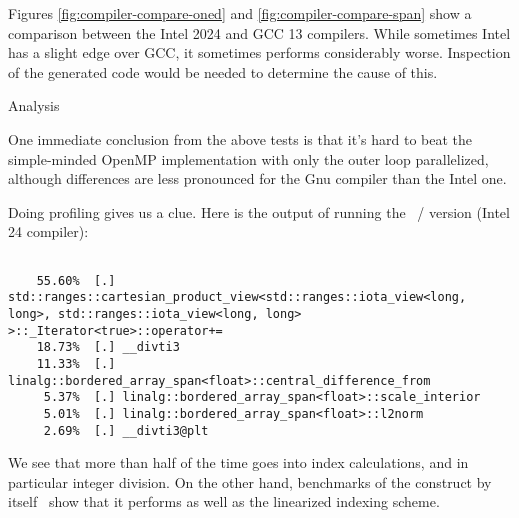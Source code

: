 Figures \ref{fig:compiler-compare-oned} and \ref{fig:compiler-compare-span}
show a comparison between the Intel 2024 and GCC 13 compilers.
While sometimes Intel has a slight edge over GCC, it sometimes
performs considerably worse.
Inspection of the generated code would be needed to determine the cause of this.

 {Analysis}
\label{sec:d2d-profile}

One immediate conclusion from the above tests is that it's
hard to beat the simple-minded OpenMP implementation
with only the outer loop parallelized,
although differences are less pronounced for the Gnu compiler
than the Intel one.

Doing profiling gives us a clue.
Here is the output of running the ~/ 
version (Intel 24 compiler):
\begin{lstlisting}[language=verbatim]
%% make run_perf VARIANTS=span NSIZE=10000 ECHO=1  

    55.60%  [.] std::ranges::cartesian_product_view<std::ranges::iota_view<long, long>, std::ranges::iota_view<long, long> >::_Iterator<true>::operator+=
    18.73%  [.] __divti3
    11.33%  [.] linalg::bordered_array_span<float>::central_difference_from
     5.37%  [.] linalg::bordered_array_span<float>::scale_interior
     5.01%  [.] linalg::bordered_array_span<float>::l2norm
     2.69%  [.] __divti3@plt
\end{lstlisting}
We see that more than half of the time goes into index calculations,
and in particular integer division.
On the other hand, benchmarks of the  construct
by itself~\cite{Hollman:mdspan} show that it performs
as well as the linearized indexing scheme.

\begin{comment}
  This makes send if we consider our `diy' implementation:
  \ompverbatimsnippet{d2ddiyiter}
  Unfortunately it's not the plus-plus operator but the plus-and-is,
  which is the bottlenect.
  For the former we can come up with trickery to lose the divisions:
  \ompverbatimsnippet{d2ddiziter}
  for the latter that's much harder.
  (Note that the tricked code has no conditionals that could give branch mispredictions!)

  Unfortunately, \indexterm{perf} does not help us much here:
  \begin{lstlisting}[language=verbatim]
    35.25%  [.] linalg::bordered_array_diy2e<float>::l2norm
    31.39%  [.] linalg::bordered_array_diy2e<float>::central_difference_from
    30.46%  [.] linalg::bordered_array_diy2e<float>::scale_interior
    2.29%  [.] linalg::bordered_array_diy2e<float>::set
  \end{lstlisting}
  We get no timings for the embedded iterator.
  Note the counterintuitive result that the norm computation takes more time than the
  central difference,
  despite the latter having more operations
  and more complicated memory access.
\end{comment}

